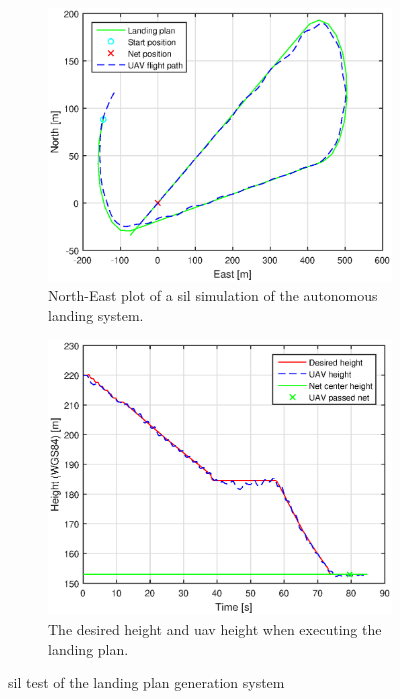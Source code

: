 \begin{figure}[H]
\centering
\begin{subfigure}{0.7\textwidth}
		\includegraphics[width=\textwidth]{figs/SysPlot/SILNorthEast6juni090145.eps}
\caption{North-East plot of a \gls{sil} simulation of the autonomous landing system.}
\label{Fig:SILNorthEast090145}
\end{subfigure}
\begin{subfigure}{0.7\textwidth}
		\includegraphics[width=\textwidth]{figs/SysPlot/SILHeight6juni090145.eps}
\caption{The desired height and \gls{uav} height when executing the landing plan.}
\label{Fig:SILHeight6juni090145}
\end{subfigure}
\caption{\gls{sil} test of the landing plan generation system}
\label{Fig:SILLandingPlan}
\end{figure}
